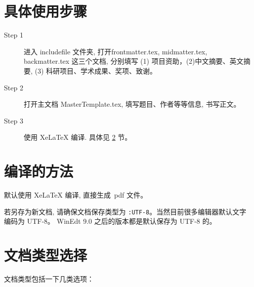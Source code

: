 \documentclass[smd,entitle,forlib,AutoFakeBold]{NJTECHMaster}
\begin{document}
\section{具体使用步骤}

\begin{description}
	
	\item[Step 1]  进入 includefile 文件夹,  打开frontmatter.tex,  midmatter.tex,  backmatter.tex 这三个文档,
	分别填写 (1) 项目资助，(2)中文摘要、英文摘要, (3) 科研项目、学术成果、奖项、致谢。
	
	\item[Step 2]  打开主文档 MasterTemplate.tex, 填写题目、作者等等信息, 书写正文。
	
	\item[Step 3]  使用 XeLaTeX 编译. 具体见 \ref{sec-compile} 节。
	
	
\end{description}

\section{编译的方法}\label{sec-compile}

默认使用 XeLaTeX 编译, 直接生成~pdf 文件。

若另存为新文档, 请确保文档保存类型为 \verb|:UTF-8|。当然目前很多编辑器默认文字编码为 UTF-8。
WinEdt 9.0 之后的版本都是默认保存为 UTF-8 的。

\section{文档类型选择}
文档类型包括一下几类选项：
\end{document}
